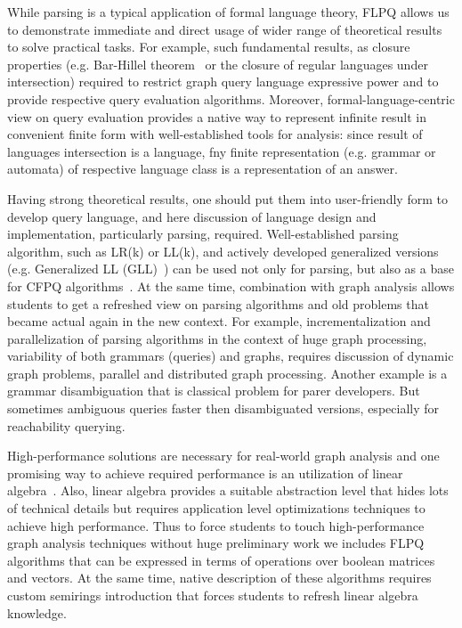 \documentclass[sigconf]{acmart}
\begin{document}
While parsing is a typical application of formal language theory, FLPQ allows us to demonstrate immediate and direct usage of wider range of theoretical results to solve practical tasks.
For example, such fundamental results, as closure properties (e.g. Bar-Hillel theorem~\cite{BarHillel61} or the closure of regular languages under intersection) required to restrict graph query language expressive power and to provide respective query evaluation algorithms.
Moreover, formal-language-centric view on query evaluation provides a native way to represent infinite result in convenient finite form with well-established tools for analysis: since result of languages intersection is a language, fny finite representation (e.g. grammar or automata) of respective language class is a representation of an answer.

Having strong theoretical results, one should put them into user-friendly form to develop query language, and here discussion of language design and implementation, particularly parsing, required.
Well-established parsing algorithm, such as LR(k) or LL(k), and actively developed generalized versions (e.g. Generalized LL (GLL)~\cite{10.1007/978-3-662-46663-6_5}) can be used not only for parsing, but also as a base for CFPQ algorithms~\cite{MEDEIROS201975,10.1007/978-3-319-91662-0_17, 10.1145/3166094.3166104}.
At the same time, combination with graph analysis allows students to get a refreshed view on parsing algorithms and old problems that became actual again in the new context.
For example, incrementalization and parallelization of parsing algorithms in the context of huge graph processing, variability of both grammars (queries) and graphs, requires discussion of dynamic graph problems, parallel and distributed graph processing.
Another example is a grammar disambiguation that is classical problem for parer developers.
But sometimes ambiguous queries faster then disambiguated versions, especially for reachability querying.

High-performance solutions are necessary for real-world graph analysis and one promising way to achieve required performance is an utilization of linear algebra~\cite{suitesparse}.
Also, linear algebra provides a suitable abstraction level that hides lots of technical details but requires application level optimizations techniques to achieve high performance.
Thus to force students to touch high-performance graph analysis techniques without huge preliminary work we includes FLPQ algorithms that can be expressed in terms of operations over boolean matrices and vectors.
At the same time, native description of these algorithms requires custom semirings introduction that forces students to refresh linear algebra knowledge. 
\end{document}
